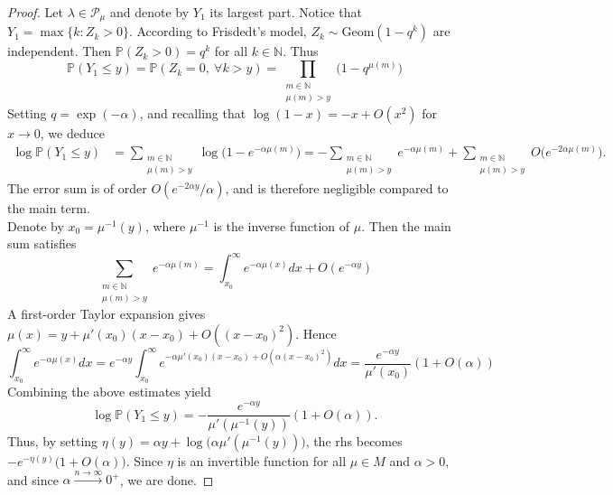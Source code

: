 \documentclass[pdflatex,sn-mathphys-num]{sn-jnl}%
\theoremstyle{thmstyleone}%
\theoremstyle{thmstyletwo}%
\theoremstyle{thmstylethree}%
\theoremstyle{thmstylethree}%
\theoremstyle{thmstylethree}%
\begin{document}
\begin{proof}
Let $\lambda\in\mathcal{P}_\mu$ and denote by $Y_1$ its largest part. Notice that $Y_1=\max\{k:Z_k>0\}$. According to Frisdedt's model, $Z_k\sim\mathrm{Geom}(1-q^k)$ are independent. Then $\mathbb{P}(Z_k>0)=q^k$ for all $k\in\mathbb{N}$. Thus
\begin{equation*}
    \mathbb{P}(Y_1\le y)=\mathbb{P}(Z_k=0, \ \forall k>y)=\prod_{\substack{m\in\mathbb{N} \\ \mu(m)>y}}\big(1-q^{\mu(m)}\big)
\end{equation*}
Setting $q=\exp(-\alpha)$, and recalling that $\log(1-x)=-x+O(x^2)$ for $x\to0$, we deduce
\begin{equation*}
\begin{split}
    \log\mathbb{P}(Y_1\le y)&=\sum_{\substack{m\in\mathbb{N} \\ \mu(m)>y}}\log\big(1-e^{-\alpha\mu(m)}\big)=-\sum_{\substack{m\in\mathbb{N} \\ \mu(m)>y}}e^{-\alpha\mu(m)} + \sum_{\substack{m\in\mathbb{N} \\ \mu(m)>y}}O\big(e^{-2\alpha\mu(m)}\big).
\end{split}
\end{equation*}
The error sum is of order $O(e^{-2\alpha y}/\alpha)$, and is therefore negligible compared to the main term. \\
Denote by $x_0=\mu^{-1}(y)$, where $\mu^{-1}$ is the inverse function of $\mu$. Then the main sum satisfies
\begin{equation*}
    \sum_{\substack{m\in\mathbb{N} \\ \mu(m)>y}}e^{-\alpha\mu(m)}=\int_{x_0}^\infty e^{-\alpha\mu(x)}dx+O(e^{-\alpha y})
\end{equation*}
A first-order Taylor expansion gives $\mu(x)=y+\mu'(x_0)(x-x_0)+O((x-x_0)^2)$. Hence
\begin{equation*}
    \int_{x_0}^\infty e^{-\alpha\mu(x)}dx=e^{-\alpha y}\int_{x_0}^\infty e^{-\alpha\mu'(x_0)(x-x_0)+O(\alpha(x-x_0)^2)}dx=\frac{e^{-\alpha y}}{\mu'(x_0)}(1+O(\alpha))
\end{equation*}
Combining the above estimates yield
\begin{equation*}
    \log\mathbb{P}(Y_1\le y)=-\frac{e^{-\alpha y}}{\mu'(\mu^{-1}(y))}(1+O(\alpha)).
\end{equation*}
Thus, by setting $\eta(y)=\alpha y + \log\big(\alpha\mu'(\mu^{-1}(y))\big)$, the rhs becomes $-e^{-\eta(y)}\big(1+O(\alpha)\big)$. Since $\eta$ is an invertible function for all $\mu\in M$ and $\alpha>0$, and since $\alpha\xrightarrow{n\to\infty}0^+$, we are done. 
\end{proof}
\end{document}
